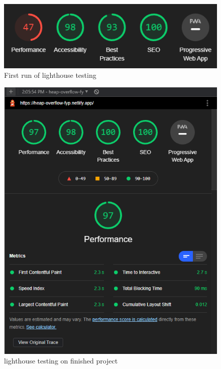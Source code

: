 \begin{figure}
    \centering
    \includegraphics[scale=0.4]{img/first-result.png}
    \caption{First run of lighthouse testing}
    \label{fig10:res1}
\end{figure}

\begin{figure}
    \centering
    \includegraphics[scale=0.4]{img/result.png}
    \caption{lighthouse testing on finished project}
    \label{fig10.1:res2}
\end{figure}

